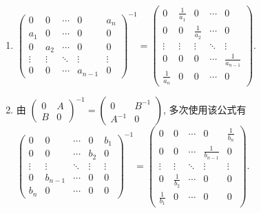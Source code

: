 \begin{enumerate}
			 \item %
			       $\begin{pmatrix}
					       0      & 0      & \cdots & 0       & a_n    \\
					       a_1    & 0      & \cdots & 0       & 0      \\
					       0      & a_2    & \cdots & 0       & 0      \\
					       \vdots & \vdots & \ddots & \vdots  & \vdots \\
					       0      & 0      & \cdots & a_{n-1} & 0
				       \end{pmatrix}^{-1} = \begin{pmatrix}
					       0             & \frac{1}{a_1} & 0             & \cdots & 0                 \\
					       0             & 0             & \frac{1}{a_2} & \cdots & 0                 \\
					       \vdots        & \vdots        & \vdots        & \ddots & \vdots            \\
					       0             & 0             & 0             & \cdots & \frac{1}{a_{n-1}} \\
					       \frac{1}{a_n} & 0             & 0             & \cdots & 0
				       \end{pmatrix}$.

			 \item %
			       由 $\begin{pmatrix}
					       0 & A \\
					       B & 0
				       \end{pmatrix}^{-1} = \begin{pmatrix}
					       0      & B^{-1} \\
					       A^{-1} & 0
				       \end{pmatrix}$, 多次使用该公式有
			       $\begin{pmatrix}
					       0      & 0       & \cdots & 0      & b_1    \\
					       0      & 0       & \cdots & b_2    & 0      \\
					       \vdots & \vdots  & \ddots & \vdots & \vdots \\
					       0      & b_{n-1} & \cdots & 0      & 0      \\
					       b_n    & 0       & \cdots & 0      & 0
				       \end{pmatrix}^{-1} = \begin{pmatrix}
					       0             & 0             & \cdots & 0                 & \frac{1}{b_n} \\
					       0             & 0             & \cdots & \frac{1}{b_{n-1}} & 0             \\
					       \vdots        & \vdots        & \ddots & \vdots            & \vdots        \\
					       0             & \frac{1}{b_2} & \cdots & 0                 & 0             \\
					       \frac{1}{b_1} & 0             & \cdots & 0                 & 0
				       \end{pmatrix}$.
		 \end{enumerate}


